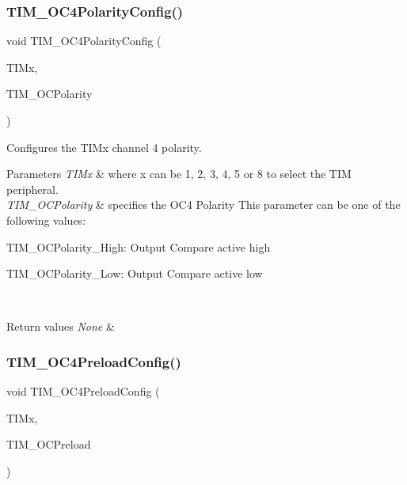 \subsubsection{\texorpdfstring{TIM\_OC4PolarityConfig()}{TIM\_OC4PolarityConfig()}}
{\footnotesize\ttfamily void T\+I\+M\+\_\+\+O\+C4\+Polarity\+Config (\begin{DoxyParamCaption}\item[{\mbox{\hyperlink{struct_t_i_m___type_def}{T\+I\+M\+\_\+\+Type\+Def}} $\ast$}]{T\+I\+Mx,  }\item[{uint16\+\_\+t}]{T\+I\+M\+\_\+\+O\+C\+Polarity }\end{DoxyParamCaption})}



Configures the T\+I\+Mx channel 4 polarity. 


\begin{DoxyParams}{Parameters}
{\em T\+I\+Mx} & where x can be 1, 2, 3, 4, 5 or 8 to select the T\+IM peripheral. \\
\hline
{\em T\+I\+M\+\_\+\+O\+C\+Polarity} & specifies the O\+C4 Polarity This parameter can be one of the following values\+: \begin{DoxyItemize}
\item T\+I\+M\+\_\+\+O\+C\+Polarity\+\_\+\+High\+: Output Compare active high \item T\+I\+M\+\_\+\+O\+C\+Polarity\+\_\+\+Low\+: Output Compare active low \end{DoxyItemize}
\\
\hline
\end{DoxyParams}

\begin{DoxyRetVals}{Return values}
{\em None} & \\
\hline
\end{DoxyRetVals}
\mbox{\label{group___t_i_m___private___functions_ga8bf4dfb35ff0c7b494dd96579f50b1ec}} 
\subsubsection{\texorpdfstring{TIM\_OC4PreloadConfig()}{TIM\_OC4PreloadConfig()}}
{\footnotesize\ttfamily void T\+I\+M\+\_\+\+O\+C4\+Preload\+Config (\begin{DoxyParamCaption}\item[{\mbox{\hyperlink{struct_t_i_m___type_def}{T\+I\+M\+\_\+\+Type\+Def}} $\ast$}]{T\+I\+Mx,  }\item[{uint16\+\_\+t}]{T\+I\+M\+\_\+\+O\+C\+Preload }\end{DoxyParamCaption})}



